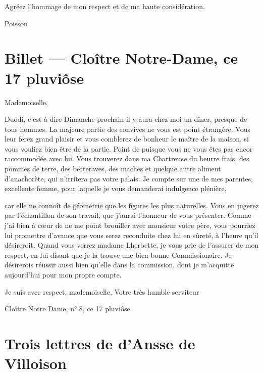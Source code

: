 \documentclass[11pt,a4paper]{article}
\begin{document}
Agréez l'hommage de mon respect et de ma haute considération.

Poisson

\section{Billet — Cloître Notre-Dame, ce 17 pluviôse}


Mademoiselle,

Duodi, c'est-à-dire Dimanche prochain il y aura chez moi un dîner, presque de
tous hommes. La majeure partie des convives ne vous est point étrangère. Vous
leur ferez grand plaisir et vous comblerez de bonheur le maître de la maison,
si vous vouliez bien être de la partie. Point de  puisque vous
ne vous êtes pas encor raccommodée avec lui. Vous trouverez dans ma Chartreuse
du beurre frais, des pommes de terre, des betteraves, des maches et quelque
autre aliment d'anachorète, qui n'irritera pas votre palais. Je compte sur une
de mes parentes, excellente femme, pour laquelle je vous demanderai indulgence
plénière,

car elle ne connoît de géométrie que les figures les plus naturelles. Vous en
jugerez par l'échantillon de son travail, que j'aurai l'honneur de vous
présenter. Comme j'ai bien à cœur de ne me point brouiller avec monsieur votre
père, vous pourriez lui promettre d'avance que vous serez reconduite chez lui
en sûreté, à l'heure qu'il désireroit. Quand vous verrez madame Lherbette, je
vous prie de l'assurer de mon respect, en lui disant que je la trouve une bien
bonne Commissionaire. Je désirerois réussir aussi bien qu'elle dans
 la commission, dont je m'acquitte aujourd'hui pour mon propre
compte.

Je suis avec respect, mademoiselle, Votre très humble serviteur \ill{}

Cloître Notre Dame, n° 8, ce 17 pluviôse

\section{Trois lettres de d'Ansse de Villoison}
\end{document}
